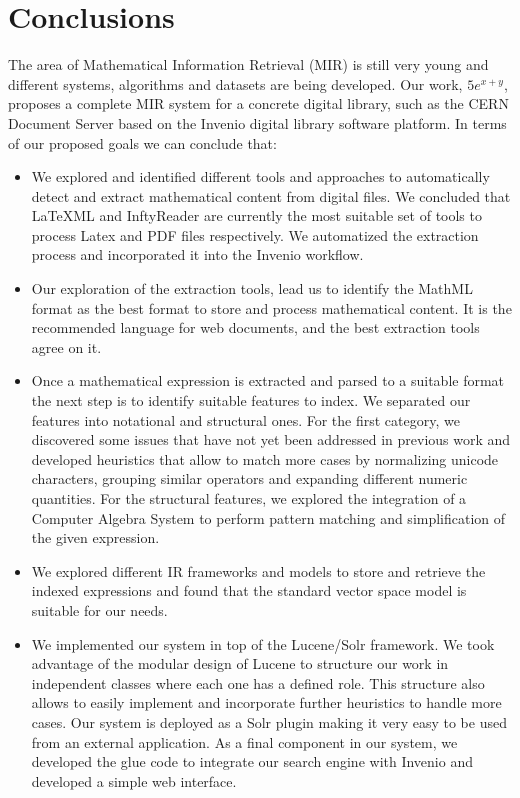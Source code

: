 \section{Conclusions}
\label{chap-conclusions}

The area of Mathematical Information Retrieval (MIR) is still very young and different systems, algorithms and datasets are being developed. Our work, $5e^{x+y}$, proposes a complete MIR system for a concrete digital library, such as the CERN Document Server based on the Invenio digital library software platform. In terms of our proposed goals we can conclude that:

\begin{itemize}
\item We explored and identified different tools and approaches to automatically detect and extract mathematical content from digital files. We concluded that LaTeXML and InftyReader are currently the most suitable set of tools to process Latex and PDF files respectively. We automatized the extraction process and incorporated it into the Invenio workflow.
\item Our exploration of the extraction tools, lead us to identify the MathML format as the best format to store and process mathematical content. It is the recommended language for web documents, and the best extraction tools agree on it.
\item Once a mathematical expression is extracted and parsed to a suitable format the next step is to identify suitable features to index. We separated our features into notational and structural ones. For the first category, we discovered  some issues that have not yet been addressed in previous work and developed heuristics that allow to match more cases by normalizing unicode characters, grouping similar operators and expanding different numeric quantities. For the structural features, we explored the integration of a Computer Algebra System  to perform pattern matching and simplification of the given expression. 
\item We explored different IR frameworks and models to store and retrieve the indexed expressions and found that the standard vector space model is suitable for our needs.  
\item We implemented our system in top of the Lucene/Solr framework. We took advantage of the modular design of Lucene to structure our work in independent classes where each one has a defined role. This structure also allows to easily implement and incorporate further heuristics to handle more cases. Our system is deployed as a Solr plugin making it very easy to be used from an external application. As a final component in our system, we developed the glue code to integrate our search engine with Invenio and developed a simple web interface.

\end{itemize}
